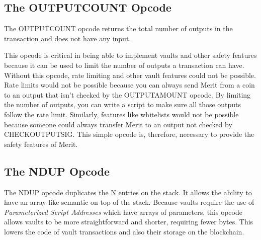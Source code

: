\documentclass{article}
\begin{document}
\subsection{The OUTPUTCOUNT Opcode}

\begin{center}
\end{center}

The OUTPUTCOUNT opcode returns the total number of outputs in the transaction and
does not have any input.

This opcode is critical in being able to implement vaults and other safety features
because it can be used to limit the number of outputs a transaction can have.
Without this opcode, rate limiting and other vault features could not be possible.
Rate limits would not be possible because you can always send Merit from a coin
to an output that isn't checked by the OUTPUTAMOUNT opcode.  By limiting the number
of outputs, you can write a script to make sure all those outputs follow the rate
limit.  Similarly, features like whitelists would not be possible because someone
could always transfer Merit to an output not checked by CHECKOUTPUTSIG.  This
simple opcode is, therefore, necessary to provide the safety features of Merit.

\subsection{The NDUP Opcode}

\begin{center}
\end{center}

The NDUP opcode duplicates the N entries on the stack.  It allows the ability to 
have an array like semantic on top of the stack.  Because vaults require the use of
\emph{Parameterized Script Addresses} which have arrays of parameters, this opcode
allows vaults to be more straightforward and shorter, requiring fewer bytes.
This lowers the code of vault transactions and also their storage on the
blockchain.
\end{document}
